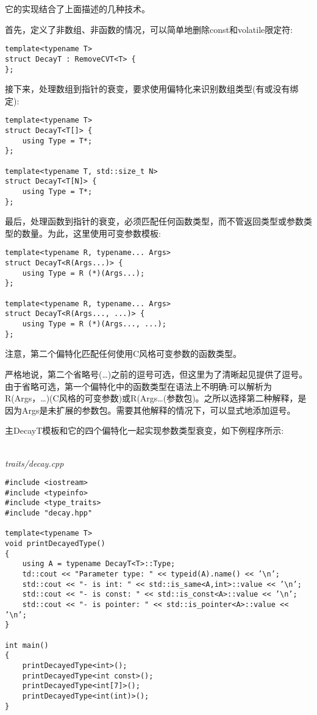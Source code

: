 它的实现结合了上面描述的几种技术。

首先，定义了非数组、非函数的情况，可以简单地删除const和volatile限定符:

\begin{lstlisting}[style=styleCXX]
template<typename T>
struct DecayT : RemoveCVT<T> {
};
\end{lstlisting}

接下来，处理数组到指针的衰变，要求使用偏特化来识别数组类型(有或没有绑定):

\begin{lstlisting}[style=styleCXX]
template<typename T>
struct DecayT<T[]> {
	using Type = T*;
};

template<typename T, std::size_t N>
struct DecayT<T[N]> {
	using Type = T*;
};
\end{lstlisting}

最后，处理函数到指针的衰变，必须匹配任何函数类型，而不管返回类型或参数类型的数量。为此，这里使用可变参数模板:

\begin{lstlisting}[style=styleCXX]
template<typename R, typename... Args>
struct DecayT<R(Args...)> {
	using Type = R (*)(Args...);
};

template<typename R, typename... Args>
struct DecayT<R(Args..., ...)> {
	using Type = R (*)(Args..., ...);
};
\end{lstlisting}

注意，第二个偏特化匹配任何使用C风格可变参数的函数类型。

\begin{tcolorbox}[colback=webgreen!5!white,colframe=webgreen!75!black]
\hspace*{0.75cm}严格地说，第二个省略号(…)之前的逗号可选，但这里为了清晰起见提供了逗号。由于省略可选，第一个偏特化中的函数类型在语法上不明确:可以解析为R(Args，…)(C风格的可变参数)或R(Args…(参数包)。之所以选择第二种解释，是因为Args是未扩展的参数包。需要其他解释的情况下，可以显式地添加逗号。
\end{tcolorbox}

主DecayT模板和它的四个偏特化一起实现参数类型衰变，如下例程序所示:

\hspace*{\fill} \\ %
\noindent
\textit{traits/decay.cpp}
\begin{lstlisting}[style=styleCXX]
#include <iostream>
#include <typeinfo>
#include <type_traits>
#include "decay.hpp"

template<typename T>
void printDecayedType()
{
	using A = typename DecayT<T>::Type;
	td::cout << "Parameter type: " << typeid(A).name() << ’\n’;
	std::cout << "- is int: " << std::is_same<A,int>::value << ’\n’;
	std::cout << "- is const: " << std::is_const<A>::value << ’\n’;
	std::cout << "- is pointer: " << std::is_pointer<A>::value << ’\n’;
}

int main()
{
	printDecayedType<int>();
	printDecayedType<int const>();
	printDecayedType<int[7]>();
	printDecayedType<int(int)>();
}
\end{lstlisting}

